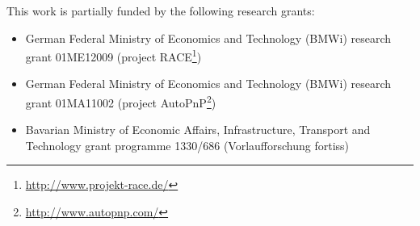 This work is partially funded by the following research grants:
\begin{itemize}
	\item German Federal Ministry of Economics and Technology (BMWi) research grant 01ME12009
		(project RACE\footnote{\url{http://www.projekt-race.de/}})
	\item German Federal Ministry of Economics and Technology (BMWi) research grant 01MA11002
		(project AutoPnP\footnote{\url{http://www.autopnp.com/}})
	\item Bavarian Ministry of Economic Affairs, Infrastructure, Transport and Technology grant programme 1330/686
		(Vorlaufforschung fortiss)
\end{itemize}
